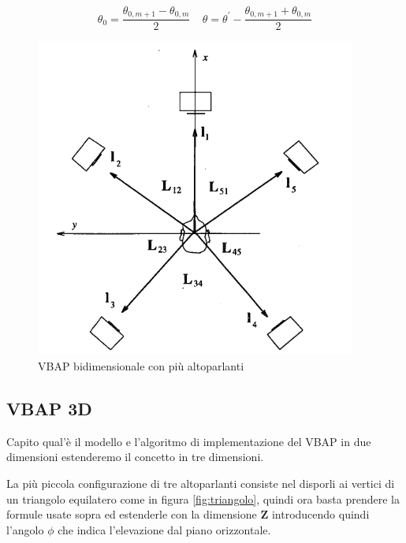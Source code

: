 \documentclass[12pt,a4paper]{report}
\begin{document}
\begin{equation}
\theta_0 = \dfrac{\theta_{0,m+1}-\theta_{0,m}}{2} \ \ \ \ \ \theta=\theta^{\prime}-\dfrac{\theta_{0,m+1}+\theta_{0,m}}{2}
\label{phidiverso}
\end{equation}


 \begin{figure}[htbp]
	\centering
	\includegraphics[scale=0.55]{figures/matrix5-1.png}
	\caption {VBAP bidimensionale con più altoparlanti}
	\label{fig:angoli5}
	\end{figure}



\subsection{VBAP 3D}

Capito qual'è il modello e l'algoritmo di implementazione del VBAP in due dimensioni estenderemo il concetto in tre dimensioni.

La più piccola configurazione di tre altoparlanti consiste nel disporli ai vertici di un triangolo equilatero come in figura \ref{fig:triangolo}, quindi ora basta prendere la formule usate sopra ed estenderle con la dimensione $\boldsymbol{Z}$ introducendo quindi l'angolo $\phi$ che indica l'elevazione dal piano orizzontale.
\end{document}
